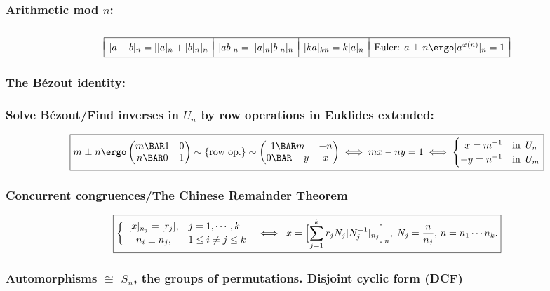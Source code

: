 \documentclass[a4paper]{article}
\begin{document}
\subsubsection*{Arithmetic mod $n$:} \vspace{-1.2em} %
\[
  \begin{array}[t]{|*{4}{l|}}
    \hline
    &&& \\[-8pt]
    [a+b]_n = [[a]_n + [b]_n]_n &
    [ab]_n = [[a]_n[b]_n]_n &
    [ka]_{kn} = k [a]_n &
    \mbox{Euler: }a\perp n \ergo [a^{\varphi(n)}]_n = 1
    \\[3pt] \hline
  \end{array}
\]%

\subsubsection*{The Bézout identity: }

\subsubsection*{Solve Bézout/Find inverses in $U_n$ by row operations in Euklides extended:} %
\[
  \boxed{
  m\perp n \ergo
  \begin{pmatrix}
    m \BAR 1 & 0 \cr
    n \BAR 0 & 1 \cr
  \end{pmatrix}
  \sim \{\mbox{row op.}\} \sim
  \begin{pmatrix}
    1 \BAR m & -n \cr
    0 \BAR -y & x \cr
  \end{pmatrix}
  \iff
  mx-ny=1
  \iff
  \begin{cases}
  \hfill  x = m^{-1}   & \text{in }\, U_n \cr
   -y = n^{-1} & \text{in }\, U_m \cr
  \end{cases}
}
\]%

\subsubsection*{Concurrent congruences/The Chinese Remainder Theorem}%
\[
  \boxed{
  \left\{
  \begin{array}{ll}
    [x]_{n_j} = [r_j],& j=1,\cdots,k \\[2pt]
  \hfil n_i\perp n_j ,& 1\le i\neq j\le k
  \end{array}\right.
\;\iff\;
x = \Bigl[ \sum_{j=1}^{k} r_jN_j[N_j^{-1}]_{n_j} \Bigr]_n, \; N_j= \frac{n}{n_j}, \,
    n=n_1\cdots n_k.
  }
\]%

\subsubsection*{Automorphisms $\cong$ $S_n$, the groups of permutations. Disjoint cyclic form (DCF)}
\end{document}
